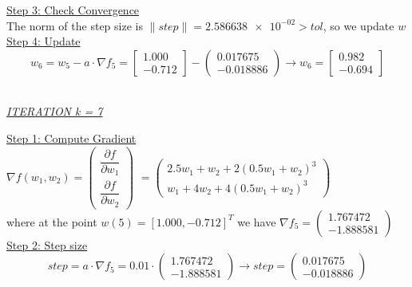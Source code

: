 \underline{Step 3: Check Convergence}\\
The norm of the step size is $\| step \| = \num{2.586638e-02} > tol$, so we update $w$
\\[4mm]

\underline{Step 4: Update}
\[ 
w_6 = w_5 - a\cdot \nabla f_5 =  \left[\begin{array}{c}
	1.000\\
	-0.712
\end{array}\right] - \left(\begin{array}{c}
	0.017675 \\
	-0.018886
\end{array}\right) \rightarrow
w_6 = \left[\begin{array}{c}
	0.982\\
	-0.694
\end{array}\right]
\]
\\[4mm]

\begin{center}
	\underline{\textit{ITERATION k = 7}}
\end{center}

\underline{Step 1: Compute Gradient}\\
\(\nabla f(w_1,w_2) = \left(\begin{array}{c}
	\dfrac{\partial f}{\partial w_1} \\[4mm]
	\dfrac{\partial f}{\partial w_2}
\end{array}\right)\) $= \left(\begin{array}{c}
	2.5w_1 + w_2 + 2(0.5w_1+w_2)^3\\[1mm]
	w_1 + 4w_2 + 4(0.5w_1+w_2)^3
\end{array}\right)$ \\[3mm]

where at the point $w\left(5\right) = \left[1.000, -0.712\right]^T$ we have $\nabla f_{5} = \left(\begin{array}{c}
	1.767472 \\
	-1.888581
\end{array}\right)$
\\[4mm]

\underline{Step 2: Step size}
\[
step = a \cdot \nabla f_{5} = 0.01 \cdot \left(\begin{array}{c}
	1.767472 \\
	-1.888581
\end{array}\right) \rightarrow step =\left(\begin{array}{c}
	0.017675 \\
	-0.018886
\end{array}\right)
\]
\\[4mm]

